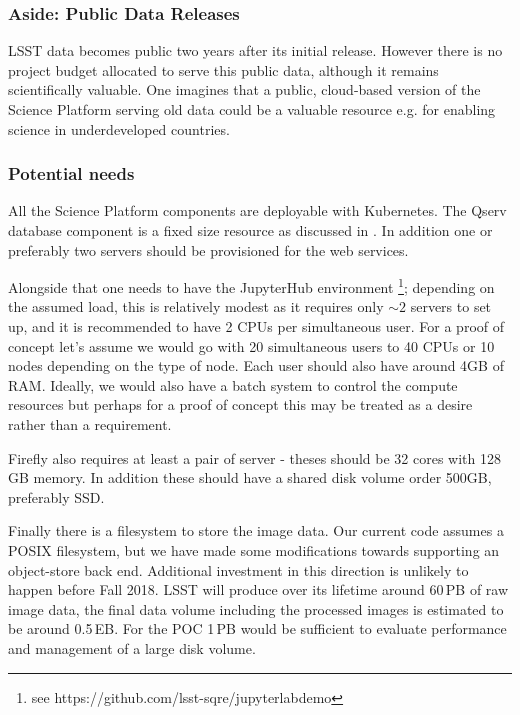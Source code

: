 \subsubsection{Aside: Public Data Releases}

LSST data becomes public two years after its initial release.
However there is no project budget allocated to serve this public data, although it remains scientifically valuable.
One imagines that a public, cloud-based version of the Science Platform serving old data could be a valuable resource e.g. for enabling science in underdeveloped countries.

\subsubsection{Potential needs}

All the Science Platform components are deployable with Kubernetes.
The Qserv database component is a fixed size resource as discussed in .
In addition one or preferably two servers should be provisioned for the web services.

Alongside that one needs to have the JupyterHub environment \footnote{see https://github.com/lsst-sqre/jupyterlabdemo}; depending on the assumed load, this is relatively modest as it requires only $\sim2$ servers to set up, and it is recommended to have 2 CPUs per simultaneous user.
For a proof of concept let's assume we would go with 20 simultaneous users to 40 CPUs or 10 nodes depending on the type of node.
Each user should also have around 4GB of RAM.
Ideally, we would also have a batch system to control the compute resources but perhaps for a proof of concept this may be treated as a desire rather than a requirement.

Firefly also requires at least a pair of  server - theses should be 32 cores
with 128 GB memory. In addition these should have a shared disk volume order 500GB, preferably SSD.

Finally there is a filesystem to store the image data.
Our current code assumes a POSIX filesystem, but we have made some modifications towards supporting an object-store back end.
Additional investment in this direction is unlikely to happen before Fall 2018.
LSST will produce over its lifetime around 60\,PB of raw image data, the final data volume including the processed images is estimated to be around 0.5\,EB.
For the POC 1\,PB would be sufficient to evaluate performance and management of a large disk volume.

